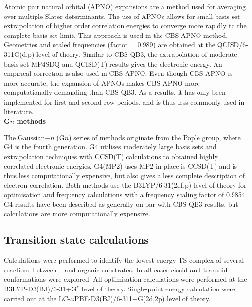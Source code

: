 Atomic pair natural orbital (APNO) expansions are a method used for averaging over multiple Slater determinants. The use of APNOs allows for small basis set extrapolation of higher order correlation energies to converge more rapidly to the complete basis set limit. This approach is used in the CBS-APNO method.\cite{Ochterski1996} Geometries and scaled frequencies (factor = 0.989) are obtained at the QCISD/6-311G(d,p) level of theory. Similar to CBS-QB3, the extrapolation of moderate basis set MP4SDQ and QCISD(T) results gives the electronic energy. An empirical correction is also used in CBS-APNO. Even though CBS-APNO is more accurate, the expansion of APNOs makes CBS-APNO more computationally demanding than CBS-QB3. As a results, it has only been implemented for first and second row periods, and is thus less commonly used in literature.
\\

\noindent \textbf{G$n$ methods}

The Gaussian$-n$ (G$n$) series of methods originate from the Pople group,\cite{Pople1989} where G4 is the fourth generation. G4 utilises moderately large basis sets and extrapolation techniques with CCSD(T) calculations to obtained highly correlated electronic energies. G4(MP2) uses MP2 in place is CCSD(T) and is thus less computationally expensive, but also gives a less complete description of electron correlation. Both methods use the B3LYP/6-31(2df,p) level of theory for optimisation and frequency calculations with a frequency scaling factor of 0.9854. G4 results have been described as generally on par with CBS-QB3 results,\cite{Somers2015, Simmie2015} but calculations are more computationally expensive.

\subsection{Transition state calculations}

Calculations were performed to identify the lowest energy TS complex of several reactions between \cumo~ and organic substrates. In all cases cisoid and transoid conformations were explored. All optimisation calculations were performed at the B3LYP-D3(BJ)/6-31+G$^*$ level of theory. Single-point energy calculation were carried out at the LC-$\omega$PBE-D3(BJ)/6-311+G(2d,2p) level of theory.

